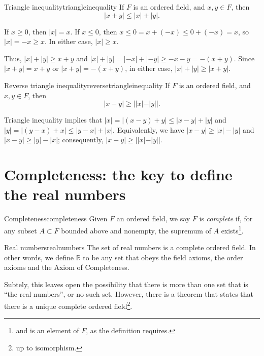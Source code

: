 \begin{thm}{Triangle inequality}{triangleinequality}
	If \(F\) is an ordered field, and \(x, y \in F\), then  \[ |x + y| \leq |x| + |y|.\]
\end{thm}

\begin{dem}{}{}
	If \(x \geq 0\), then \(|x| = x\). If \(x \leq 0\), then \(x \leq 0 = x + (-x) \leq 0 + (-x) = x\), so \(|x| = -x \geq x\). In either case, \(|x| \geq x\).

	Thus,  \(|x| + |y| \geq x + y\)	and \(|x| + |y| = |-x| + |-y| \geq - x - y = -(x + y)\). Since  \(|x + y| = x + y\) or  \(|x + y| = -(x+y)\), in either case, \(|x| + |y| \geq |x + y|\).
\end{dem}

\begin{thm}{Reverse triangle inequality}{reversetriangleinequality}
	If \(F\) is an ordered field, and \(x, y \in F\), then \[
		|x - y| \geq ||x| - |y||.
	\]
\end{thm}

\begin{dem}{}{}
	Triangle inequality implies that \(|x| = |(x - y) + y| \leq |x - y| + |y|\) and  \(|y| = |(y - x) + x| \leq |y - x| + |x|\). Equivalently, we have \(|x - y| \geq |x| - |y|\) and \(|x - y| \geq |y| - |x|\); consequently, \(|x - y| \geq ||x| - |y||\).
\end{dem}

\section{Completeness: the key to define the real numbers}

\begin{defn}{Completeness}{completeness}
	Given \(F\) an ordered field, we say \(F\) is \emph{complete} if, for any subset \(A \subset F\) bounded above and nonempty, the supremum of \(A\) exists\footnote{and is an element of \(F\), as the definition requires.}.
\end{defn}

\begin{defn}{Real numbers}{realnumbers}
	The set of real numbers is a complete ordered field. In other words, we define \(\mathbb{R}\) to be any set that obeys the field axioms, the order axioms and the Axiom of Completeness.
\end{defn}

Subtely, this leaves open the possibility that there is more than one set that is ``the real numbers'', or no such set. However, there is a theorem that states that there is a unique complete ordered field\footnote{up to isomorphism.}.
